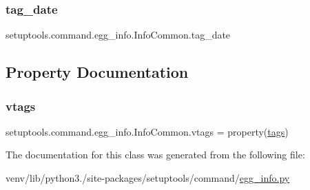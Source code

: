 \subsubsection{\texorpdfstring{tag\+\_\+date}{tag\_date}}
{\footnotesize\ttfamily setuptools.\+command.\+egg\+\_\+info.\+Info\+Common.\+tag\+\_\+date\hspace{0.3cm}{\ttfamily [static]}}



\subsection{Property Documentation}
\mbox{\label{classsetuptools_1_1command_1_1egg__info_1_1InfoCommon_ad699e9f4f9736bf13473c0cd01464648}} 
\subsubsection{\texorpdfstring{vtags}{vtags}}
{\footnotesize\ttfamily setuptools.\+command.\+egg\+\_\+info.\+Info\+Common.\+vtags = property(\hyperlink{classsetuptools_1_1command_1_1egg__info_1_1InfoCommon_a9d01045a03a1438d0f9e9e88855fbca0}{tags})\hspace{0.3cm}{\ttfamily [static]}}



The documentation for this class was generated from the following file\+:\begin{DoxyCompactItemize}
\item 
venv/lib/python3./site-\/packages/setuptools/command/\hyperlink{setuptools_2command_2egg__info_8py}{egg\+\_\+info.\+py}\end{DoxyCompactItemize}
